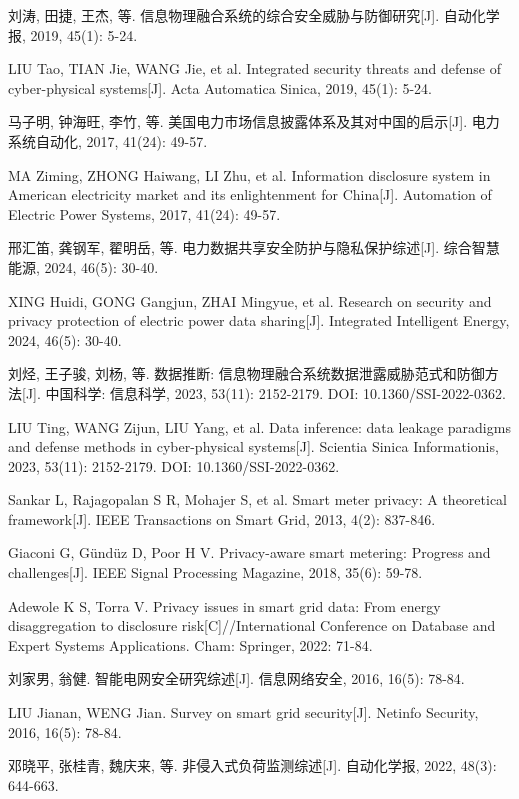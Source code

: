 刘涛, 田捷, 王杰, 等. 信息物理融合系统的综合安全威胁与防御研究[J]. 自动化学报, 2019, 45(1): 5-24.

LIU Tao, TIAN Jie, WANG Jie, et al. Integrated security threats and defense of cyber-physical systems[J]. Acta Automatica Sinica, 2019, 45(1): 5-24.

马子明, 钟海旺, 李竹, 等. 美国电力市场信息披露体系及其对中国的启示[J]. 电力系统自动化, 2017, 41(24): 49-57.

MA Ziming, ZHONG Haiwang, LI Zhu, et al. Information disclosure system in American electricity market and its enlightenment for China[J]. Automation of Electric Power Systems, 2017, 41(24): 49-57.

邢汇笛, 龚钢军, 翟明岳, 等. 电力数据共享安全防护与隐私保护综述[J]. 综合智慧能源, 2024, 46(5): 30-40.

XING Huidi, GONG Gangjun, ZHAI Mingyue, et al. Research on security and privacy protection of electric power data sharing[J]. Integrated Intelligent Energy, 2024, 46(5): 30-40.

刘烃, 王子骏, 刘杨, 等. 数据推断: 信息物理融合系统数据泄露威胁范式和防御方法[J]. 中国科学: 信息科学, 2023, 53(11): 2152-2179. DOI: 10.1360/SSI-2022-0362.

LIU Ting, WANG Zijun, LIU Yang, et al. Data inference: data leakage paradigms and defense methods in cyber-physical systems[J]. Scientia Sinica Informationis, 2023, 53(11): 2152-2179. DOI: 10.1360/SSI-2022-0362.

Sankar L, Rajagopalan S R, Mohajer S, et al. Smart meter privacy: A theoretical framework[J]. IEEE Transactions on Smart Grid, 2013, 4(2): 837-846.

Giaconi G, Gündüz D, Poor H V. Privacy-aware smart metering: Progress and challenges[J]. IEEE Signal Processing Magazine, 2018, 35(6): 59-78.

Adewole K S, Torra V. Privacy issues in smart grid data: From energy disaggregation to disclosure risk[C]//International Conference on Database and Expert Systems Applications. Cham: Springer, 2022: 71-84.

刘家男, 翁健. 智能电网安全研究综述[J]. 信息网络安全, 2016, 16(5): 78-84.

LIU Jianan, WENG Jian. Survey on smart grid security[J]. Netinfo Security, 2016, 16(5): 78-84.

邓晓平, 张桂青, 魏庆来, 等. 非侵入式负荷监测综述[J]. 自动化学报, 2022, 48(3): 644-663.

